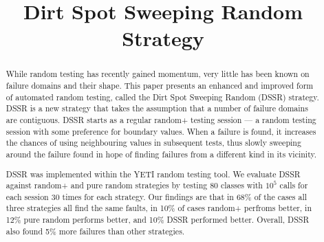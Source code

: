 \documentclass[conference]{IEEEtran}
\begin{document}
\title{Dirt Spot Sweeping Random Strategy}
\author{

\and
{}
}

\maketitle


\begin{abstract}
While random testing has recently gained momentum, very little has been known on failure domains and their shape. 
This paper presents an enhanced and improved form of automated random testing, called the Dirt Spot Sweeping Random (DSSR) strategy. DSSR is a new strategy that takes the assumption that a number of failure domains are contiguous.
DSSR starts as a regular random+ testing session --- a random testing session with some preference for boundary values. 
When a failure is found, it increases the chances of using neighbouring values in subsequent tests, thus slowly sweeping around the failure found in hope of finding failures from a different kind in its vicinity.

DSSR was implemented within the YETI random testing tool. We evaluate DSSR against random+ and pure random strategies by testing 80 classes with $10^5$ calls for each session 30 times for each strategy.
Our findings are that in 68\% of the cases all three strategies all find the same faults, in 10\% of cases random+ perfroms better, in 12\% pure random performs better, and 10\% DSSR performed better.
Overall, DSSR also found 5\% more failures than other strategies.
\end{abstract}
\IEEEpeerreviewmaketitle

%
\end{document}
